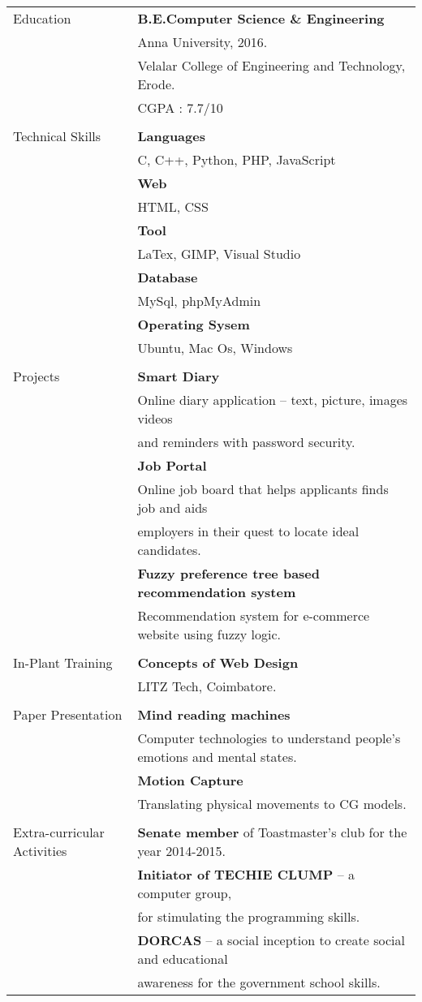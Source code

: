 \documentclass[letterpaper,11pt,oneside]{article}
\begin{document}
\noindent \begin{tabular}{@{} l l}
\Large{Education}    & \textbf{B.E.Computer Science \& Engineering} \\
     & Anna University, 2016. \\
     & Velalar College of Engineering and Technology, Erode. \\
     & CGPA : 7.7/10 \\
     & \\
\Large{Technical Skills}    & \textbf{Languages} \\
     & C, C++, Python, PHP, JavaScript \\
     & \textbf{Web} \\
     & HTML, CSS \\
     & \textbf{Tool}\\
     & LaTex, GIMP, Visual Studio \\
     & \textbf{Database} \\
     & MySql, phpMyAdmin \\
     & \textbf{Operating Sysem} \\
     & Ubuntu, Mac Os, Windows\\
     & \\
  \Large{Projects}   & \textbf{Smart Diary} \\
     & Online diary application – text, picture, images videos \\
     & and reminders with password security. \\
     & \textbf{Job Portal} \\
     & Online job board that helps applicants finds job and aids \\
     & employers in their quest to locate ideal candidates. \\
     & \textbf{Fuzzy preference tree based recommendation system} \\
     & Recommendation system for e-commerce website using fuzzy logic. \\
     & \\
\Large{In-Plant Training}  & \textbf{Concepts of Web Design}\\
     & LITZ Tech, Coimbatore.\\
     &\\
\Large{Paper Presentation} & \textbf{Mind reading machines}\\
     &Computer technologies to understand people's emotions and mental states.\\
     &\textbf{Motion Capture}\\
     &Translating physical movements to CG models.\\
     &\\
\Large{Extra-curricular Activities} & \textbf{Senate member} of Toastmaster's club for the year 2014-2015.\\
    & \textbf{Initiator of TECHIE CLUMP} – a computer group, \\
    &for stimulating the programming skills.\\
    & \textbf{DORCAS} – a social inception to create social and educational\\
    &awareness for the government school skills.\\
\end{tabular}
\end{document}
